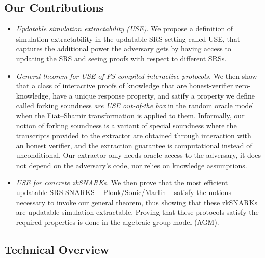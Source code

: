 \subsection{Our Contributions}
\begin{itemize}
\item 
\emph{Updatable simulation extractability (USE)}. 
We propose a definition of simulation extractability in the updatable SRS setting called USE, that captures the additional power the adversary gets by having access to updating the SRS and seeing proofs with respect to different SRSs.
    
\item 
\emph{General theorem for USE of FS-compiled interactive protocols.}
We then show that a class of interactive proofs of knowledge that are honest-verifier zero-knowledge,
have a unique response property, and satify a property we define called forking soundness \emph{are USE out-of-the box} in the random oracle model when the Fiat--Shamir transformation is applied to them. 
Informally, our notion of forking soundness is a variant of special soundness where the transcripts provided to the extractor are
obtained through interaction with an honest verifier, and the extraction guarantee is computational instead of unconditional. 
Our extractor only needs oracle access to the adversary, it does not depend on the adversary’s code, nor relies on knowledge
assumptions.
    
\item
\emph{USE for concrete zkSNARKs.}
We then prove that the most efficient updatable SRS SNARKS -- Plonk/Sonic/Marlin -- satisfy the notions necessary to invoke our general theorem, thus showing that these zkSNARKs are updatable simulation extractable.
Proving that these protocols satisfy the required properties is done in the algebraic group model (AGM).
	
\end{itemize}



\subsection{Technical Overview}

